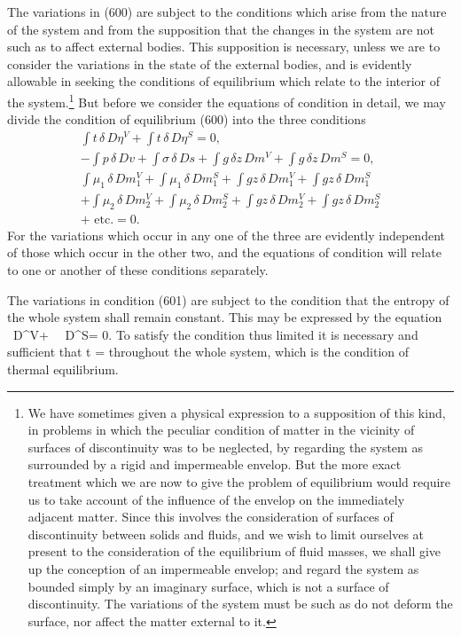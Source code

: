 \documentclass[12pt]{memoir}
\newcommand{\dd}{\delta}
\begin{document}
The variations in (600) are subject to the conditions which arise from the nature of the system and from the supposition that the changes in the system are not such as to affect external bodies. This supposition is necessary, unless we are to consider the variations in the state of the external bodies, and is evidently allowable in seeking the conditions of equilibrium which relate to the interior of the system.\footnote{We have sometimes given a physical expression to a supposition of this kind, in problems in which the peculiar condition of matter in the vicinity of surfaces of discontinuity was to be neglected, by regarding the system as surrounded by a rigid and impermeable envelop. But the more exact treatment which we are now to give the problem of equilibrium would require us to take account of the influence of the envelop on the immediately adjacent matter. Since this involves the consideration of surfaces of discontinuity between solids and fluids, and we wish to limit ourselves at present to the consideration of the equilibrium of fluid masses, we shall give up the conception of an impermeable envelop; and regard the system as bounded simply by an imaginary surface, which is not a surface of discontinuity. The variations of the system must be such as do not deform the surface, nor affect the matter external to it.} But before we consider the equations of condition in detail, we may divide the condition of equilibrium (600) into the three conditions
\begin{gather}\int t \, \dd \, D\eta^V+ \int t \, \dd \, D\eta^S = 0,   \label{601} \\
-\int p \, \dd \, Dv + \int \sigma \, \dd \, Ds + \int g \, \dd z \, Dm^V +\int g \, \dd z \, Dm^S = 0,  \label{602} \\
\int \mu_1 \,\dd\,Dm_1^V +  \int \mu_1 \,\dd\,Dm_1^S + \int gz \, \dd \, Dm_1^V+ \int gz \, \dd \, Dm_1^S \nonumber \\
+\int \mu_2 \,\dd\,Dm_2^V +  \int \mu_2 \,\dd\,Dm_2^S + \int gz \, \dd \, Dm_2^V+ \int gz \, \dd \, Dm_2^S  \nonumber \\
+ \text{ etc.} = 0.   \label{603} \end{gather}
For the variations which occur in any one of the three are evidently independent of those which occur in the other two, and the equations of condition will relate to one or another of these conditions separately.

The variations in condition (601) are subject to the condition that the entropy of the whole system shall remain constant. This may be expressed by the equation
\eqs \int \, \dd \, D\eta^V+ \int \, \dd \, D\eta^S= 0.  \label{604} \eqe
To satisfy the condition thus limited it is necessary and sufficient that
\eqs t =   \label{605} \eqe
throughout the whole system, which is the condition of thermal equilibrium.
\end{document}
